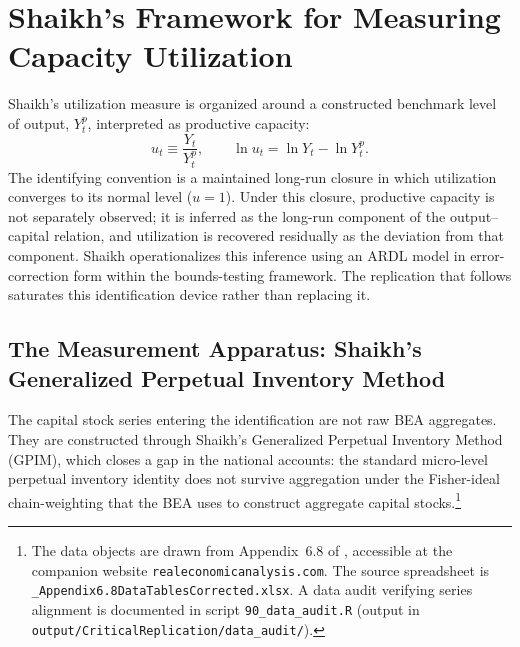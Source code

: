 \documentclass[11pt,a4paper]{article}
\begin{document}
\section{Shaikh's Framework for Measuring Capacity Utilization}
\label{sec:shaikh_framework}

Shaikh's utilization measure is organized around a constructed benchmark
level of output, $Y_t^p$, interpreted as productive capacity:
%
\begin{equation}
	u_t \equiv \frac{Y_t}{Y_t^p},
	\qquad
	\ln u_t = \ln Y_t - \ln Y_t^p.
\end{equation}
%
The identifying convention is a maintained long-run closure in which
utilization converges to its normal level ($u = 1$). Under this closure,
productive capacity is not separately observed; it is inferred as the
long-run component of the output--capital relation, and utilization is
recovered residually as the deviation from that component. Shaikh
operationalizes this inference using an ARDL model in error-correction form
within the \citet{Pesaran2001} bounds-testing framework. The replication
that follows saturates this identification device rather than replacing it.



\subsection{The Measurement Apparatus: Shaikh's Generalized Perpetual
Inventory Method}
\label{subsec:gpim}

The capital stock series entering the identification are not raw BEA
aggregates. They are constructed through Shaikh's Generalized Perpetual
Inventory Method (GPIM), which closes a gap in the national accounts: the
standard micro-level perpetual inventory identity does not survive
aggregation under the Fisher-ideal chain-weighting that the BEA uses to
construct aggregate capital stocks.\footnote{The data objects are drawn from
Appendix~6.8 of \citet{Shaikh2016}, accessible at the companion website
\texttt{realeconomicanalysis.com}. The source spreadsheet is
\texttt{\_Appendix6.8DataTablesCorrected.xlsx}. A data audit verifying
series alignment is documented in script \texttt{90\_data\_audit.R}
(output in \texttt{output/CriticalReplication/data\_audit/}).}
\end{document}
